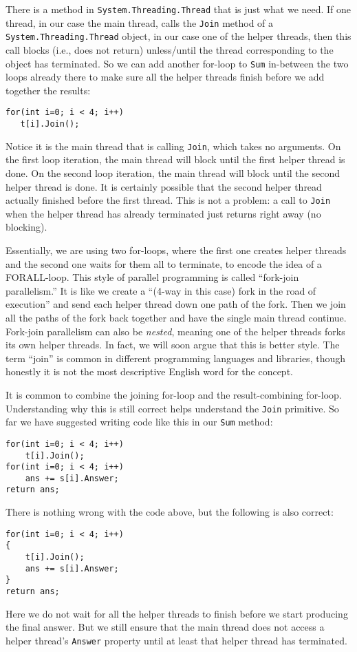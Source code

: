 \documentclass[10pt]{article}
\begin{document}
There is a method in {\tt System.Threading.Thread} that is just what 
we need. If one thread, in our case the main thread, calls the {\tt Join} 
method of a {\tt System.Threading.Thread} object, in our case one of 
the helper threads, then this call blocks (i.e., does not return) unless/until 
the thread corresponding to the object has terminated. So we can add 
another for-loop to {\tt Sum} in-between the two loops already there 
to make sure all the helper threads finish before we add together the results:
\begin{verbatim}
for(int i=0; i < 4; i++)
   t[i].Join();
\end{verbatim}
Notice it is the main thread that is calling {\tt Join}, which takes
no arguments.  On the first loop iteration, the main thread will block
until the first helper thread is done.  On the second loop iteration,
the main thread will block until the second helper thread is done.  It
is certainly possible that the second helper thread actually finished
before the first thread.  This is not a problem: a call to {\tt Join}
when the helper thread has already terminated just returns right away
(no blocking).

Essentially, we are using two for-loops, where the first one creates
helper threads and the second one waits for them all to terminate, to
encode the idea of a FORALL-loop.  This style of parallel programming
is called ``fork-join parallelism.''  It is like we create a ``(4-way
in this case) fork in the road of execution'' and send each helper
thread down one path of the fork.  Then we join all the paths of the
fork back together and have the single main thread continue.
Fork-join parallelism can also be \emph{nested}, meaning one of the
helper threads forks its own helper threads.  In fact, we will soon
argue that this is better style.  The term ``join'' is common
in different programming languages and libraries, though honestly it
is not the most descriptive English word for the concept.

It is common to combine the joining for-loop and the
result-combining for-loop. Understanding why this is still correct
helps understand the {\tt Join} primitive.  So far we have suggested
writing code like this in our {\tt Sum} method:
\goodbreak
\begin{verbatim}
for(int i=0; i < 4; i++)
    t[i].Join();
for(int i=0; i < 4; i++)
    ans += s[i].Answer;
return ans;
\end{verbatim}
There is nothing wrong with the code above, but the following is also
correct:
\begin{verbatim}
for(int i=0; i < 4; i++)
{
    t[i].Join();
    ans += s[i].Answer;
}
return ans;
\end{verbatim}
Here we do not wait for all the helper threads to finish before we
start producing the final answer.  But we still ensure that the main
thread does not access a helper thread's {\tt Answer} property until at least that
helper thread has terminated.
\end{document}
